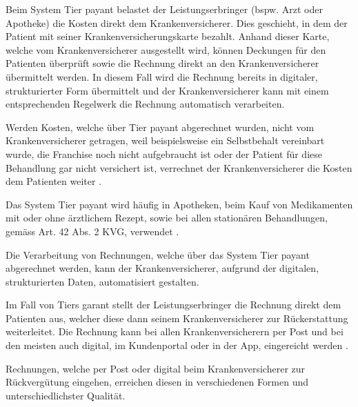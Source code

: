 \documentclass{hwz}
\begin{document}

Beim System Tier payant belastet der Leistungserbringer (bspw. Arzt oder Apotheke) die Kosten direkt dem Krankenversicherer. Dies geschieht, in dem der Patient mit seiner Kranken\-versicherungskarte bezahlt. Anhand dieser Karte, welche vom Krankenversicherer ausgestellt wird, können Deckungen für den Patienten überprüft sowie die Rechnung direkt an den Krankenversicherer übermittelt werden. In diesem Fall wird die Rechnung bereits in digitaler, strukturierter Form übermittelt und der Krankenversicherer kann mit einem entsprechenden Regelwerk die Rechnung automatisch verarbeiten. 

Werden Kosten, welche über Tier payant abgerechnet wurden, nicht vom Krankenversicherer getragen, weil beispielsweise ein Selbstbehalt vereinbart wurde, die Franchise noch nicht aufgebraucht ist oder der Patient für diese Behandlung gar nicht versichert ist, verrechnet der Krankenversicherer die Kosten dem Patienten weiter \autocite{EidgenossischesDepartementdesInnern2017FaktenblattVergutungssysteme}.

Das System Tier payant wird häufig in Apotheken, beim Kauf von Medikamenten mit oder ohne ärztlichem Rezept, sowie bei allen stationären Behandlungen, gemäss Art. 42 Abs. 2 KVG, verwendet \autocite{EidgenossischesDepartementdesInnern2017FaktenblattVergutungssysteme}.

Die Verarbeitung von Rechnungen, welche über das System Tier payant abgerechnet werden, kann der Krankenversicherer, aufgrund der digitalen, strukturierten Daten, automatisiert gestalten.

Im Fall von Tiers garant stellt der Leistungserbringer die Rechnung direkt dem Patienten aus, welcher diese dann seinem Krankenversicherer zur Rückerstattung weiterleitet. Die Rechnung kann bei allen Krankenversicherern per Post und bei den meisten auch digital, im Kundenportal oder in der App, eingereicht werden \autocite{EidgenossischesDepartementdesInnern2017FaktenblattVergutungssysteme}.

Rechnungen, welche per Post oder digital beim Krankenversicherer zur Rückvergütung eingehen, erreichen diesen in verschiedenen Formen und unterschiedlichster Qualität. 
\end{document}
